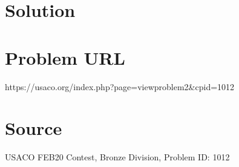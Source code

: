 \documentclass[12pt]{article}
\begin{document}
\section*{Solution}


\section*{Problem URL}
https://usaco.org/index.php?page=viewproblem2&cpid=1012

\section*{Source}
USACO FEB20 Contest, Bronze Division, Problem ID: 1012
\end{document}
